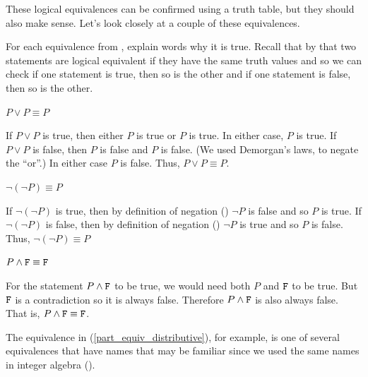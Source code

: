 These logical equivalences can be confirmed using a truth table, but they should also make sense.  Let's look closely at a couple of these equivalences.

\begin{exam}
\label{exam_understand_equiv_negTF}
    For each equivalence from , explain words why it is true.  Recall that by  that two statements are logical equivalent if they have the same truth values and so we can check if one statement is true, then so is the other and if one statement is false, then so is the other.  
        \begin{apart}
            \item $P \lor P \equiv P$ 
                \begin{soln}
                    If $P \lor P$ is true, then either $P$ is true or $P$ is true.  In either case, $P$ is true.  If $P \lor P$ is false, then $P$ is false and $P$ is false. (We used Demorgan's laws,  to negate the ``or''.) In either case $P$ is false.  Thus, $P \lor P \equiv P$.
                \end{soln}
            \item $\neg (\neg P) \equiv P$ 
                \begin{soln}
                    If $\neg (\neg P)$ is true, then by definition of negation () $\neg P$ is false and so $P$ is true.  If $\neg (\neg P)$ is false, then by definition of negation () $\neg P$ is true and so $P$ is false. Thus, $\neg (\neg P) \equiv P$
                \end{soln}
            \item $P \land \texttt{F}  \equiv \texttt{F}$ 
                \begin{soln}
                    For the statement $P \land \texttt{F}$ to be true, we would need both $P$ and $\texttt{F}$ to be true.  But $\texttt{F}$ is a contradiction so it is always false.  Therefore $P \land \texttt{F}$ is also always false. That is, $P \land \texttt{F} \equiv \texttt{F}$.
                \end{soln}
        \end{apart}
\end{exam}

The equivalence in  (\ref{part_equiv_distributive}), for example, is one of several equivalences that have names that may be familiar since we used the same names in integer algebra ().

